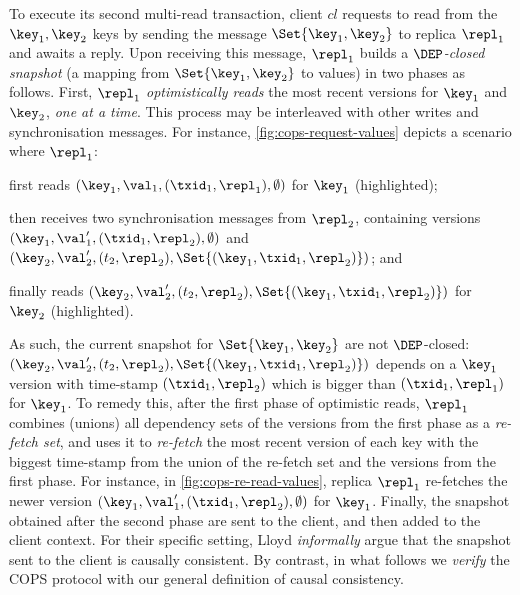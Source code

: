 To execute its second multi-read transaction,
client  \( cl \) requests to read from the $\key_1, \key_2$ keys by sending the message 
\( \Set{\key_1, \key_2} \) to replica $\repl_1$ and awaits a reply.
Upon receiving this message, $\repl_1$ builds a \emph{\( \DEP \)-closed snapshot} (a mapping from $\Set{\key_1, \key_2}$ to values) in two phases as follows. 
First, $\repl_1$ \emph{optimistically reads} the most recent versions for $\key_1$ and $\key_2$,
\emph{one at a time}. 
This process may be interleaved with other writes and synchronisation messages. 
For instance, \cref{fig:cops-request-values} depicts a scenario where \( \repl_1 \):
\begin{enumerate*}
	\item first reads \( (\key_1,\val_1,(\txid_1,\repl_1), \emptyset) \) for $\key_1$ (highlighted); %
	\item then receives two synchronisation messages from \( \repl_2 \), 
containing versions \( ( \key_1, \val'_1, (\txid_1,\repl_2),\emptyset ) \) and \( ( \key_2, \val'_2, (t_2,\repl_2),\Set{(\key_1,\txid_1,\repl_2)} ) \); and
	\item finally reads \( ( \key_2, \val'_2, (t_2,\repl_2),\Set{(\key_1,\txid_1,\repl_2)} ) \) for $\key_2$ (highlighted).
\end{enumerate*}
As such, the current snapshot for \( \Set{\key_1,\key_2}\) are not \( \DEP \)-closed: 
\( ( \key_2, \val'_2, (t_2,\repl_2),\Set{(\key_1,\txid_1,\repl_2)} ) \) depends on 
a $\key_1$ version with time-stamp $(\txid_1, \repl_2)$ which is bigger than $(\txid_1, \repl_1)$ for $\key_1$.
To remedy this, after the first phase of optimistic reads,
$\repl_1$ combines (unions) all dependency sets of the versions from the first phase as a \emph{re-fetch set},
and uses it to \emph{re-fetch}
the most recent version of each key with the biggest time-stamp 
from the union of the re-fetch set and the versions from the first phase.
For instance, in \cref{fig:cops-re-read-values}, replica $\repl_1$ re-fetches 
the newer version \( ( \key_1, \val'_1, (\txid_1,\repl_2),\emptyset ) \) for \( \key_1 \).
Finally, the snapshot obtained after the second phase 
are sent to the client, and then added to the client context.
For their specific setting, Lloyd \etal\citet{cops} \emph{informally} argue that the snapshot sent to the client is causally consistent.
By contrast, in what follows we \emph{verify} the COPS protocol with our general definition of causal consistency.



